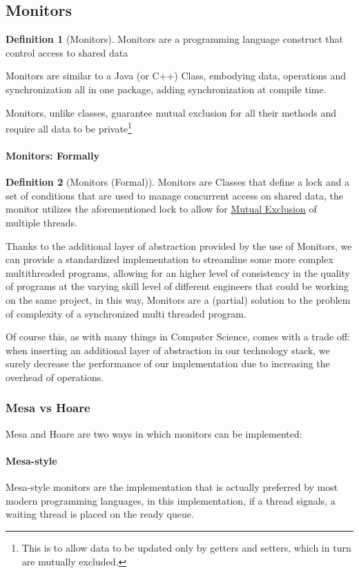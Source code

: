 \documentclass[openright, twoside]{report}
\theoremstyle{definition}
\newtheorem{definition}{Definition}[section]
\theoremstyle{example}
\begin{document}
	\subsection{Monitors}
	\begin{definition}[Monitors]
		Monitors are a programming language construct that control access to shared data
	\end{definition}
	Monitors are similar to a Java (or C++) Class, embodying data, operations and synchronization
	all in one package, adding synchronization at compile time.

	Monitors, unlike classes, guarantee mutual exclusion for all their methods and require 
	all data to be private\footnote{This is to allow data to be updated only by getters 
	and setters, which in turn are mutually excluded.}

	\paragraph{Monitors: Formally}
	\begin{definition}[Monitors (Formal)]
		Monitors are Classes that define a lock and a set of conditions that 
		are used to manage concurrent access on shared data, the monitor utilizes 
		the aforementioned lock to allow for \hyperref[par:mutex]{Mutual Exclusion} of multiple threads.
	\end{definition}

	Thanks to the additional layer of abstraction provided by the use of Monitors, 
	we can provide a standardized implementation to streamline some more complex multithreaded programs, 
	allowing for an higher level of consistency in the quality of programs at the varying skill level of 
	different engineers that could be working on the same project, in this way, Monitors are a (partial) 
	solution to the problem of complexity of a synchronized multi threaded program.

	Of course this, as with many things in Computer Science, comes with a trade off: when inserting 
	an additional layer of abstraction in our technology stack, we surely decrease the performance of
	our implementation due to increasing the overhead of operations.

	\subsubsection{Mesa vs Hoare}
	Mesa and Hoare are two ways in which monitors can be implemented:

	\paragraph{Mesa-style}
	Mesa-style monitors are the implementation that is actually preferred 
	by most modern programming languages, in this implementation, 
	if a thread signals, a waiting thread is placed on the ready queue.
\end{document}

